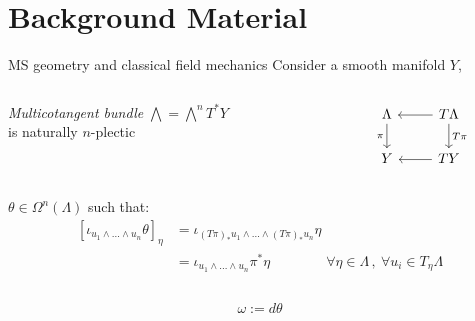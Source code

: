 \documentclass[beamer,10pt]{standalone}
\begin{document}

\section{Background Material}

\begin{frame}[fragile]{MS geometry and classical field mechanics}
		Consider a smooth manifold $Y$,
		\begin{columns}
			\hfill
			\begin{column}{.5\linewidth}
				\emph{Multicotangent bundle} $\bigwedge = \bigwedge^n T^\ast Y$\\
				is naturally $n$-plectic
			\end{column}
			\begin{column}{.4\linewidth}
				\[
				\begin{tikzcd}
					\Lambda \ar[d,"\pi"'] & T \Lambda \ar[d,"T \pi"] \ar[l] \\
					Y								& T Y \ar[l]
				\end{tikzcd}	
				\]
			\end{column}
		\end{columns}
	\pause
	\begin{defblock}
		$\theta \in \Omega^n(\Lambda)$ such that:
		\begin{displaymath}
		\begin{split}
			\left[ \iota_{u_1 \wedge \ldots \wedge u_n} \theta \right]_\eta 
			&= \iota_{(T \pi)_\ast u_1 \wedge \ldots \wedge (T \pi)_\ast u_n} \eta \\
			&= \iota_{u_1 \wedge \ldots \wedge u_n} \pi^\ast \eta 
			\qquad \qquad \forall \eta \in \Lambda \, , \: \forall u_i \in T_\eta \Lambda 		
		\end{split}
		\end{displaymath}
	\end{defblock}
	\vfill
	\begin{columns}
		\begin{column}{.6\linewidth}
			\begin{defblock}
				$$\omega := d \theta$$
			\end{defblock}

\end{column}
\end{columns}
\end{frame}
\end{document}

